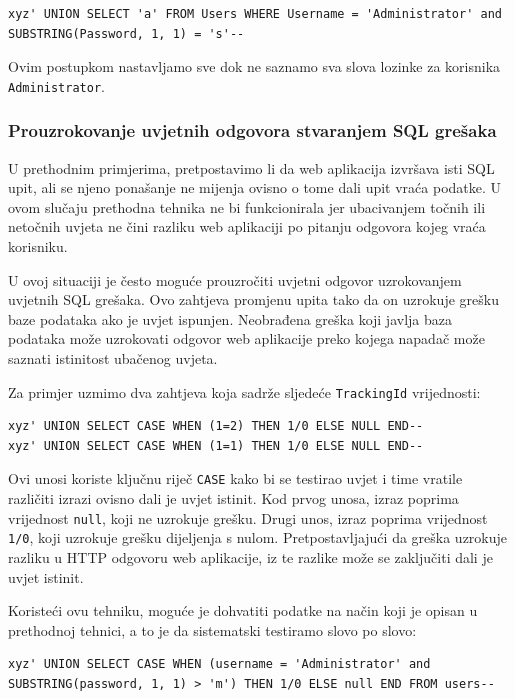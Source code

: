 \documentclass[12pt, oneside, onecolumn]{book}
\begin{document}
{\begin{verbatim}
xyz' UNION SELECT 'a' FROM Users WHERE Username = 'Administrator' and SUBSTRING(Password, 1, 1) = 's'--
\end{verbatim}

Ovim postupkom nastavljamo sve dok ne saznamo sva slova lozinke za korisnika \texttt{Administrator}.

\subsubsection{Prouzrokovanje uvjetnih odgovora stvaranjem SQL grešaka}
U prethodnim primjerima, pretpostavimo li da web aplikacija izvršava isti SQL upit, ali se njeno ponašanje ne mijenja ovisno o tome dali upit vraća podatke. U ovom slučaju prethodna tehnika ne bi funkcionirala jer ubacivanjem točnih ili netočnih uvjeta ne čini razliku web aplikaciji po pitanju odgovora kojeg vraća korisniku.

U ovoj situaciji je često moguće prouzročiti uvjetni odgovor uzrokovanjem uvjetnih SQL grešaka. Ovo zahtjeva promjenu upita tako da on uzrokuje grešku baze podataka ako je uvjet ispunjen. Neobrađena greška koji javlja baza podataka može uzrokovati odgovor web aplikacije preko kojega napadač može saznati istinitost ubačenog uvjeta.

Za primjer uzmimo dva zahtjeva koja sadrže sljedeće \texttt{TrackingId} vrijednosti:

\begin{verbatim}
xyz' UNION SELECT CASE WHEN (1=2) THEN 1/0 ELSE NULL END--
xyz' UNION SELECT CASE WHEN (1=1) THEN 1/0 ELSE NULL END--
\end{verbatim}

Ovi unosi koriste ključnu riječ \texttt{CASE} kako bi se testirao uvjet i time vratile različiti izrazi ovisno dali je uvjet istinit. Kod prvog unosa, izraz poprima vrijednost \texttt{null}, koji ne uzrokuje grešku. Drugi unos, izraz poprima vrijednost \texttt{1/0}, koji uzrokuje grešku dijeljenja s nulom. Pretpostavljajući da greška uzrokuje razliku u HTTP odgovoru web aplikacije, iz te razlike može se zaključiti dali je uvjet istinit.

Koristeći ovu tehniku, moguće je dohvatiti podatke na način koji je opisan u prethodnoj tehnici, a to je da sistematski testiramo slovo po slovo:

\begin{verbatim}
xyz' UNION SELECT CASE WHEN (username = 'Administrator' and SUBSTRING(password, 1, 1) > 'm') THEN 1/0 ELSE null END FROM users--
\end{verbatim}

}
\end{document}
